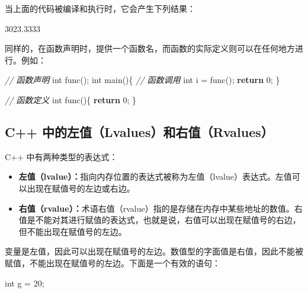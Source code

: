 \documentclass[
]{article}
\newenvironment{Shaded}{}{}
\newcommand{\CommentTok}[1]{\textcolor[rgb]{0.38,0.63,0.69}{\textit{#1}}}
\newcommand{\ControlFlowTok}[1]{\textcolor[rgb]{0.00,0.44,0.13}{\textbf{#1}}}
\newcommand{\DataTypeTok}[1]{\textcolor[rgb]{0.56,0.13,0.00}{#1}}
\newcommand{\DecValTok}[1]{\textcolor[rgb]{0.25,0.63,0.44}{#1}}
\newcommand{\FloatTok}[1]{\textcolor[rgb]{0.25,0.63,0.44}{#1}}
\newcommand{\NormalTok}[1]{#1}
\newcommand{\OperatorTok}[1]{\textcolor[rgb]{0.40,0.40,0.40}{#1}}
\providecommand{\tightlist}{%
  \setlength{\itemsep}{0pt}\setlength{\parskip}{0pt}}
\begin{document}
当上面的代码被编译和执行时，它会产生下列结果：

\begin{Shaded}
\begin{Highlighting}[]
\FloatTok{3023.3333}
\end{Highlighting}
\end{Shaded}

同样的，在函数声明时，提供一个函数名，而函数的实际定义则可以在任何地方进行。例如：

\begin{Shaded}
\begin{Highlighting}[]
\CommentTok{// 函数声明}
\DataTypeTok{int}\NormalTok{ func}\OperatorTok{();}  
\DataTypeTok{int}\NormalTok{ main}\OperatorTok{()\{}
\CommentTok{// 函数调用}
   \DataTypeTok{int}\NormalTok{ i }\OperatorTok{=}\NormalTok{ func}\OperatorTok{();}
   \ControlFlowTok{return} \DecValTok{0}\OperatorTok{;}
\OperatorTok{\}}

\CommentTok{// 函数定义}
\DataTypeTok{int}\NormalTok{ func}\OperatorTok{()\{}
   \ControlFlowTok{return} \DecValTok{0}\OperatorTok{;}
\OperatorTok{\}}
\end{Highlighting}
\end{Shaded}

\hypertarget{c-ux4e2dux7684ux5de6ux503clvaluesux548cux53f3ux503crvalues}{%
\subsection{C++
中的左值（Lvalues）和右值（Rvalues）}\label{c-ux4e2dux7684ux5de6ux503clvaluesux548cux53f3ux503crvalues}}

C++ 中有两种类型的表达式：

\begin{itemize}
\tightlist
\item
  \textbf{左值（lvalue）：}指向内存位置的表达式被称为左值（lvalue）表达式。左值可以出现在赋值号的左边或右边。
\item
  \textbf{右值（rvalue）：}术语右值（rvalue）指的是存储在内存中某些地址的数值。右值是不能对其进行赋值的表达式，也就是说，右值可以出现在赋值号的右边，但不能出现在赋值号的左边。
\end{itemize}

变量是左值，因此可以出现在赋值号的左边。数值型的字面值是右值，因此不能被赋值，不能出现在赋值号的左边。下面是一个有效的语句：

\begin{Shaded}
\begin{Highlighting}[]
\DataTypeTok{int}\NormalTok{ g }\OperatorTok{=} \DecValTok{20}\OperatorTok{;}
\end{Highlighting}
\end{Shaded}
\end{document}
